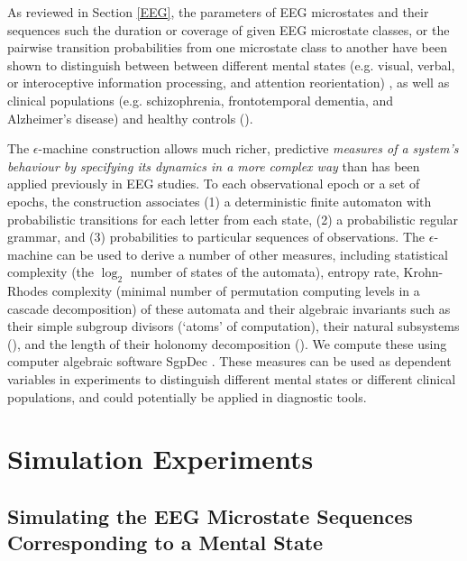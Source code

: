 \documentclass[journal]{IEEEtran}
\begin{document}
 




As reviewed in Section \ref{EEG}, the parameters of  EEG microstates and their sequences such the duration or coverage of given EEG microstate classes, or the pairwise transition probabilities
 from one microstate class to another have been shown to distinguish between 
 between different mental states (e.g. visual, verbal, or interoceptive information processing, and  attention reorientation) \cite{Milz2016}, as well as clinical populations (e.g. schizophrenia, frontotemporal dementia, and Alzheimer's disease) and healthy controls (\cite{Lehmann2005,Nishida2013}).
 
 The $\epsilon$-machine construction allows much richer, predictive  {\em measures of a system's behaviour by specifying its dynamics in a more complex way} than has been applied previously in EEG studies. To each observational epoch or a set of epochs, the construction
  associates (1) a deterministic finite automaton
 with probabilistic transitions for each letter from each state, (2) a probabilistic regular grammar, and (3) probabilities to particular sequences of
 observations. The $\epsilon$-machine can be used to derive a number of other measures, including statistical complexity (the $\log_2$ number
 of states of the automata), entropy rate,  Krohn-Rhodes complexity  (minimal number of permutation computing levels in a cascade decomposition) of these automata and their algebraic invariants such as
 their simple subgroup divisors (`atoms' of computation), their natural subsystems  (\cite{wildbook,royalsoc}), and the length of their holonomy decomposition (\cite{EilenbergB,AttilaJamesChrystopher}).
 We compute these using computer algebraic software SgpDec \cite{AttilaJamesChrystopher}.
 These measures can be used as dependent variables in experiments to distinguish different mental states or different clinical populations,
 and could potentially be applied in diagnostic tools.
 
  

\section{Simulation Experiments}\label{Exp}







\subsection{Simulating the EEG Microstate Sequences Corresponding to a Mental State} 
\end{document}
